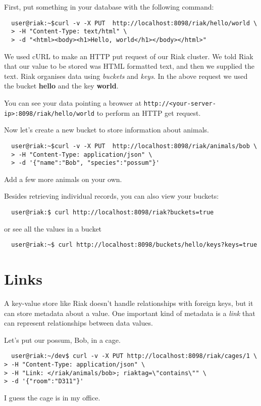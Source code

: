 \documentclass{article}
\begin{document}
First, put something in your database with the following command:
\begin{verbatim}
  user@riak:~$curl -v -X PUT  http://localhost:8098/riak/hello/world \
  > -H "Content-Type: text/html" \
  > -d "<html><body><h1>Hello, world</h1></body></html>"
  \end{verbatim}

We used cURL to make an HTTP put request of our Riak cluster.  We told Riak that our value to be stored was HTML formatted text, and then we supplied the text.  Riak organises data using \emph{buckets} and \emph{keys}.  In the above request we used the bucket \textbf{hello} and the key \textbf{world}.

You can see your data pointing a browser at \texttt{http://<your-server-ip>:8098/riak/hello/world} to perform an HTTP get request. 

Now let's create a new bucket to store information about animals.
\begin{verbatim}
  user@riak:~$curl -v -X PUT  http://localhost:8098/riak/animals/bob \
  > -H "Content-Type: application/json" \
  > -d '{"name":"Bob", "species":"possum"}'
  \end{verbatim}
  
Add a few more animals on your own.

Besides retrieving individual records, you can also view your buckets:
\begin{verbatim}
  user@riak:$ curl http://localhost:8098/riak?buckets=true
\end{verbatim}
or see all the values in a bucket
\begin{verbatim}
  user@riak:~$ curl http://localhost:8098/buckets/hello/keys?keys=true
\end{verbatim}

\section{Links}
A key-value store like Riak doesn't handle relationships with foreign keys, but it can store metadata about a value.  One important kind of metadata is a \emph{link} that can represent relationships between data values.

Let's put our possum, Bob, in a cage.
 \begin{verbatim}
  user@riak:~/dev$ curl -v -X PUT http://localhost:8098/riak/cages/1 \
> -H "Content-Type: application/json" \
> -H "Link: </riak/animals/bob>; riaktag=\"contains\"" \
> -d '{"room":"D311"}'
\end{verbatim}
I guess the cage is in my office.
\end{document}
